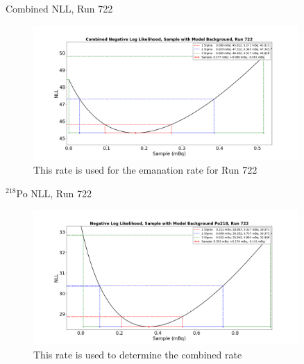 \documentclass[aspectratio=169]{beamer}
\begin{document}
\begin{frame}{Combined NLL, Run 722}
    \begin{figure}
        \begin{center}
            \includegraphics[width=0.9\textwidth]
            {assets/722/comNLL.png}
            \caption{This rate is used for the emanation rate for Run 722}
        \end{center}
    \end{figure}
\end{frame}

\begin{frame}{$^{218}$Po NLL, Run 722}
    \begin{figure}
        \begin{center}
            \includegraphics[width=0.9\textwidth]
            {assets/722/NLL218.png}
            \caption{This rate is used to determine the combined rate}
        \end{center}
    \end{figure}
\end{frame}
\end{document}
